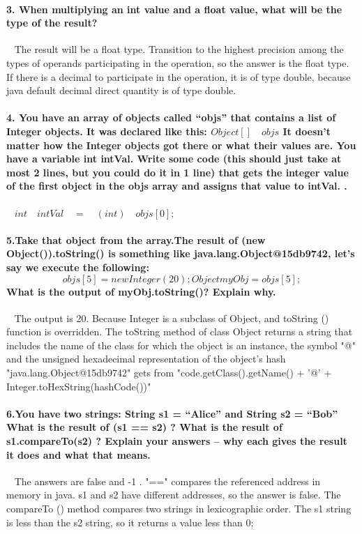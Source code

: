 \documentclass[12pt, leqno]{article}
\begin{document}
\paragraph*{3. When multiplying an int value and a float value, what will be the type of the result?}~{}
\newline\indent The result will be a float type. Transition to the highest precision among the types of operands participating in the operation, so the answer is the float type. If there is a decimal to participate in the operation, it is of type double, because java default decimal direct quantity is of type double.

\paragraph*{4. You have an array of objects called “objs” that contains a list of Integer objects. It was declared like this:
	$Object[]\quad objs$
	It doesn’t matter how the Integer objects got there or what their values are.
	You have a variable int intVal. Write some code (this should just take at most 2 lines, but you could do it in 1 line) that gets the integer value of the first object in the objs array and assigns that value to intVal.
	.}~{}
\newline \indent $int\quad intVal\quad=\quad(int)\quad objs[0];$
\newpage
\paragraph*{5.Take that object from the array.The result of (new Object()).toString() is something like java.lang.Object@15db9742, let’s say we execute the following:
	\[objs[5] = new Integer(20);
	Object myObj = objs[5];\]
	What is the output of myObj.toString()? Explain why.
}~{}
\newline\indent The output is 20. Because Integer is a subclass of Object, and toString () function is overridden.
\newline\indent The toString method of class Object returns a string that includes the name of the class for which the object is an instance, the symbol "@" and the unsigned hexadecimal representation of the object's hash \newline\indent"java.lang.Object@15db9742" gets from "code.getClass().getName() + '@' + Integer.toHexString(hashCode())"
\paragraph*{6.You have two strings: String s1 = “Alice” and String s2 = “Bob”
	What is the result of (s1 == s2) ?
	What is the result of s1.compareTo(s2) ?
	Explain your answers – why each gives the result it does and what that means.	
}~{}
\newline\indent The answers are false and -1 . "==" compares the referenced address in memory in java. s1 and s2 have different addresses, so the answer is false. The compareTo () method compares two strings in lexicographic order. The s1 string is less than the s2 string, so it returns a value less than 0;
\end{document}
